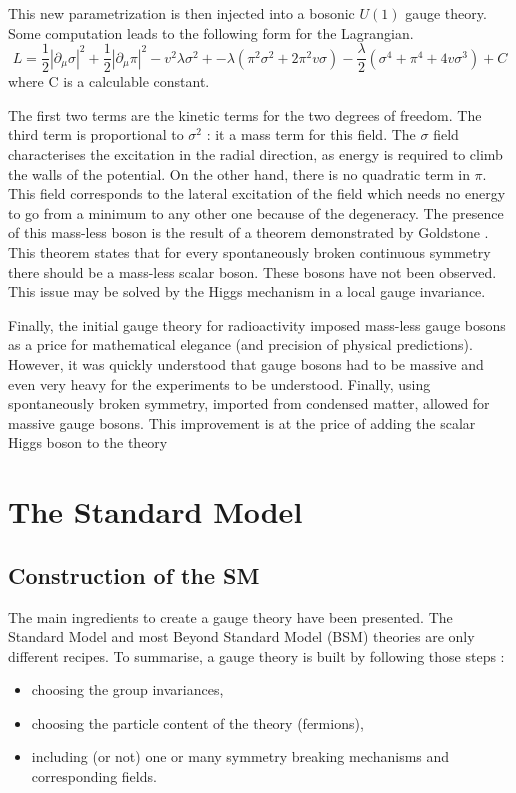 This new parametrization is then injected into a bosonic \(U(1)\) gauge theory.
Some computation leads to the following form for the Lagrangian.
\begin{equation}
\label{eq:orgf74cc7a}
L = \frac{1}{2}|\partial_\mu\sigma|^2 + \frac{1}{2}|\partial_\mu\pi|^2 -v^2\lambda\sigma^2 +  - \lambda( \pi^2\sigma^2 + 2 \pi^2 v \sigma ) - \frac{\lambda}{2}(\sigma^4+\pi^4 + 4v\sigma^3) + C
\end{equation}
where C is a calculable constant.

The first two terms are the kinetic terms for the two degrees of freedom.
The third term is proportional to \(\sigma^{\text{2}}\) : it a mass term for this field.
The \(\sigma\) field characterises the excitation in the radial direction, as energy is required to climb the walls of the potential.
On the other hand, there is no quadratic term in \(\pi\).
This field corresponds to the lateral excitation of the field which needs no energy to go from a minimum to any other one because of the degeneracy.
The presence of this mass-less boson is the result of a theorem demonstrated by Goldstone \cite{PhysRev.127.965}.
This theorem states that for every spontaneously broken continuous symmetry there should be a mass-less scalar boson.
These bosons have not been observed.
This issue may be solved by the Higgs mechanism in a local gauge invariance.

Finally, the initial gauge theory for radioactivity imposed mass-less gauge bosons as a price for mathematical elegance (and precision of physical predictions).
However, it was quickly understood that gauge bosons had to be massive and even very heavy for the experiments to be understood.
Finally, using spontaneously broken symmetry, imported from condensed matter, allowed for massive gauge bosons.
This improvement is at the price of adding the scalar Higgs boson to the theory


\section{The Standard Model}
\label{sec:orga563bf8}

\subsection{Construction of the SM}
\label{sec:orgb0b6048}

The main ingredients to create a gauge theory have been presented.
The Standard Model and most Beyond Standard Model (BSM) theories are only different recipes.
To summarise, a gauge theory is built by following those steps :
\begin{itemize}
\item choosing the group invariances,
\item choosing the particle content of the theory (fermions),
\item including (or not) one or many symmetry breaking mechanisms and corresponding fields.
\end{itemize}

